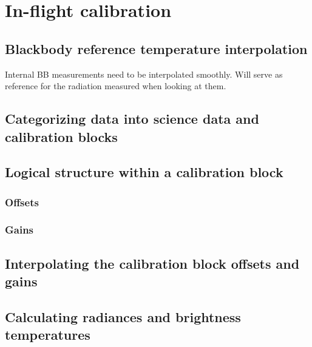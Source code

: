 \section{In-flight calibration}

\subsection{Blackbody reference temperature interpolation}

Internal BB measurements need to be interpolated smoothly. Will serve as reference for the radiation measured when looking at them.

\subsection{Categorizing data into science data and calibration blocks}


\subsection{Logical structure within a calibration block}
\subsubsection{Offsets}
\subsubsection{Gains}

\subsection{Interpolating the calibration block offsets and gains}

\subsection{Calculating radiances and brightness temperatures}

